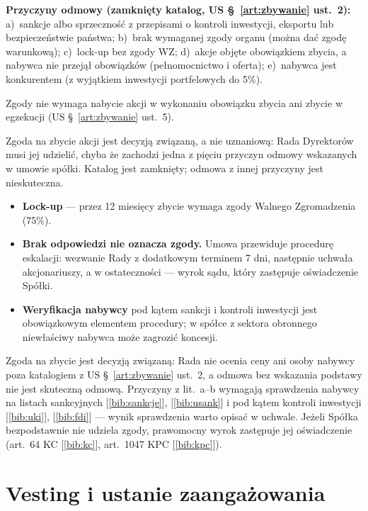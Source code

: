 \documentclass[11pt,a4paper]{report}
\newcommand{\Zr}[1]{[\ref{bib:#1}]}
\begin{document}
\textbf{Przyczyny odmowy (zamknięty katalog, US §~\ref{art:zbywanie} ust.~2):} a)~sankcje albo sprzeczność z przepisami o kontroli inwestycji, eksportu lub bezpieczeństwie państwa; b)~brak wymaganej zgody organu (można dać zgodę warunkową); c)~lock-up bez zgody WZ; d)~akcje objęte obowiązkiem zbycia, a nabywca nie przejął obowiązków (pełnomocnictwo i oferta); e)~nabywca jest konkurentem (z wyjątkiem inwestycji portfelowych do 5\%).

Zgody nie wymaga nabycie akcji w wykonaniu obowiązku zbycia ani zbycie w egzekucji (US §~\ref{art:zbywanie} ust.~5).

\begin{OCoChodzi}
Zgoda na zbycie akcji jest decyzją związaną, a nie uznaniową: Rada Dyrektorów musi jej udzielić, chyba że zachodzi jedna z pięciu przyczyn odmowy wskazanych w umowie spółki. Katalog jest zamknięty; odmowa z innej przyczyny jest nieskuteczna.
\begin{itemize}
  \item \textbf{Lock-up} --- przez 12 miesięcy zbycie wymaga zgody Walnego Zgromadzenia (75\%).
  \item \textbf{Brak odpowiedzi nie oznacza zgody.} Umowa przewiduje procedurę eskalacji: wezwanie Rady z dodatkowym terminem 7 dni, następnie uchwała akcjonariuszy, a w ostateczności --- wyrok sądu, który zastępuje oświadczenie Spółki.
  \item \textbf{Weryfikacja nabywcy} pod kątem sankcji i kontroli inwestycji jest obowiązkowym elementem procedury; w spółce z sektora obronnego niewłaściwy nabywca może zagrozić koncesji.
\end{itemize}
\end{OCoChodzi}

\begin{Komentarz}
Zgoda na zbycie jest decyzją związaną: Rada nie ocenia ceny ani osoby nabywcy poza katalogiem z US §~\ref{art:zbywanie} ust.~2, a odmowa bez wskazania podstawy nie jest skuteczną odmową. Przyczyny z lit.~a--b wymagają sprawdzenia nabywcy na listach sankcyjnych \Zr{sankcje}, \Zr{usank} i pod kątem kontroli inwestycji \Zr{uki}, \Zr{fdi} --- wynik sprawdzenia warto opisać w uchwale. Jeżeli Spółka bezpodstawnie nie udziela zgody, prawomocny wyrok zastępuje jej oświadczenie (art.~64 KC \Zr{kc}, art.~1047 KPC \Zr{kpc}).
\end{Komentarz}

\section{Vesting i ustanie zaangażowania}
\end{document}
